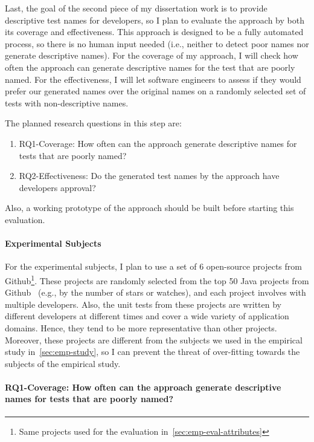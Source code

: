 Last, the goal of the second piece of my dissertation work is to provide descriptive test names for developers, so I plan to evaluate the approach by both its coverage and effectiveness.
%
This approach is designed to be a fully automated process, so there is no human input needed (i.e., neither to detect poor names nor generate descriptive names).
%
For the coverage of my approach, I will check how often the approach can generate descriptive names for the test that are poorly named.
%
For the effectiveness, I will let software engineers to assess if they would prefer our generated names over the original names on a randomly selected set of tests with non-descriptive names.


The planned research questions in this step are:
%
\begin{enumerate}
    \item RQ1-Coverage: How often can the approach generate descriptive names for tests that are poorly named?
    \item RQ2-Effectiveness: Do the generated test names by the approach have developers approval?
\end{enumerate}
%
Also, a working prototype of the approach should be built before starting this evaluation.


\paragraph{Experimental Subjects}

For the experimental subjects, I plan to use a set of \num{6} open-source projects from Github\footnote{Same projects used for the evaluation in~\cref{sec:emp-eval-attributes}}.
%
These projects are randomly selected from the top \num{50} Java projects from Github~\cite{top50projects} (e.g., by the number of stars or watches), and each project involves with multiple developers.
%
Also, the unit tests from these projects are written by different developers at different times and cover a wide variety of application domains.
%
Hence, they tend to be more representative than other projects.
%
Moreover, these projects are different from the subjects we used in the empirical study in~\cref{sec:emp-study}, so I can prevent the threat of over-fitting towards the subjects of the empirical study.


\paragraph{RQ1-Coverage: How often can the approach generate descriptive names for tests that are poorly named?}

